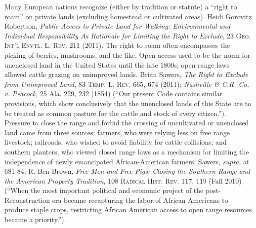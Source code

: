 \item Many European nations recognize (either by tradition or statute) a ``right
to roam'' on private lands (excluding homestead or cultivated areas). Heidi
Gorovitz Robertson, \emph{Public Access to Private Land for Walking:
Environmental and
Individual Responsibility As Rationale for Limiting the Right to Exclude}, 23
\textsc{Geo. Int'l Envtl. L. Rev}. 211 (2011). The right to roam often
encompasses the picking of berries, mushrooms, and the like. Open access used to
be the norm for unenclosed land in the United States until the late 1800s; open
range laws allowed cattle grazing on unimproved lands. Brian Sawers, \emph{The
Right to Exclude from Unimproved Land}, 83 \textsc{Temp. L. Rev}. 665, 674
(2011); \emph{Nashville \& C.R. Co. v. Peacock}, 25 Ala. 229, 232 (1854) (``Our
present
Code contains similar provisions, which show conclusively that the unenclosed
lands of this State are to be treated as common pasture for the cattle and stock
of every citizen.''). Pressure to close the range and forbid the crossing of
uncultivated or unenclosed land came from three sources: farmers, who were
relying less on free range livestock; railroads, who wished to avoid liability
for cattle collisions; and southern planters, who viewed closed range laws as a
mechanism for limiting the independence of newly emancipated African-American
farmers. Sawers, \emph{supra}, at 681-84; R. Ben Brown, \textit{Free Men and
Free Pigs: Closing the Southern Range and the American Property Tradition}, 108
\textsc{Radical Hist. Rev.} 117, 119 (Fall 2010) (``When the most important
political
and economic project of the post-Reconstruction era became recapturing the labor
of African Americans to produce staple crops, restricting African American
access to open range resources became a priority.'').

